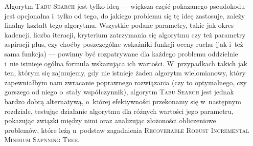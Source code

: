 Algorytm \textsc{Tabu Search} jest tylko ideą --- większa część pokazanego pseudokodu jest opcjonalna i~tylko od tego, do jakiego problemu się tę ideę zastosuje, zależy finalny kształt tego algorytmu. Wszystkie podane parametry, takie jak okres kadencji, liczba iteracji, kryterium zatrzymania się algorytmu czy też parametry aspiracji plus, czy choćby poszczególne wskaźniki funkcji oceny ruchu (jak i~też sama funkcja) --- powinny być rozpatrywane dla każdego problemu oddzielnie i~nie istnieje ogólna formuła wskazująca ich wartości. W~przypadkach takich jak ten, którym się zajmujemy, gdy nie istnieje żaden algorytm wielomianowy, który zapewniałbym nam zwracanie poprawnego rozwiązania (czy to optymalnego, czy gorszego od niego o~stały współczynnik), algorytm \textsc{Tabu Search} jest jednak bardzo dobrą alternatywą, o~której efektywności przekonamy się w~następnym rozdziale, testując działanie algorytmu dla różnych wartości jego parametru, pokazując związki między nimi oraz analizując złożoności obliczeniowe problemów, które leżą u~podstaw zagadnienia \textsc{Recoverable Robust Incremental Minimum Sapnning Tree}.